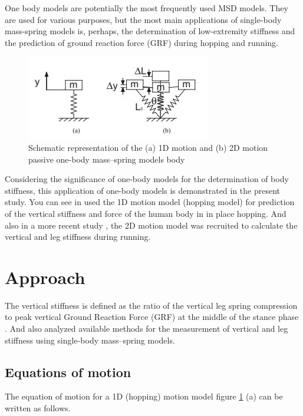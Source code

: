 \documentclass[extendedabs]{AAVL}
\begin{document}
One body models are potentially the most frequently used MSD models. They are used for various purposes, but the most main applications of single-body mass-spring models is, perhaps, the determination of low-extremity stiffness and the prediction of ground reaction force (GRF) during hopping and running. 

\begin{figure}[hbt!]
\includegraphics[width=\linewidth]{images/a.jpg}
\caption{Schematic representation of the (a) 1D motion
and (b) 2D motion passive one-body mass–spring models body}
\vspace{-2mm}
\label{fig:a}
\end{figure}

Considering the significance of one-body models for the determination of body stiffness, this application of one-body models is demonstrated in the present study. You can see in \cite{a} used the 1D motion model (hopping model) for prediction of the vertical stiffness and force of the human body in in place hopping. And also in a more recent study \cite{b}, the 2D motion model was recruited to calculate the vertical
and leg stiffness during running. 

\section{Approach}
The vertical stiffness is defined as the ratio of the vertical leg spring compression to peak vertical Ground Reaction Force (GRF) at the middle of the stance phase \cite{b,c}. And also \cite{d} analyzed available methods for the measurement of vertical and leg stiffness using single-body mass–spring models. 

\subsection{Equations of motion}
\label{a}
The equation of motion for a 1D (hopping) motion model figure \ref{fig:a} (a) can be written as follows.
\end{document}
